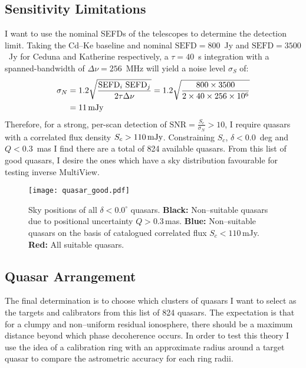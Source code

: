     \subsection{Sensitivity Limitations}   			
    	I want to use the nominal SEFDs of the telescopes to determine the detection limit. Taking the Cd--Ke baseline and nominal $\text{SEFD}=800$~Jy and $\text{SEFD}=3500$~Jy for Ceduna and Katherine respectively, a $\tau=40$~s integration with a spanned-bandwidth of $\Delta\nu=256$~MHz will yield a noise level $\sigma_S$ of: 	
    	\begin{align*}
    		\sigma_N & = 1.2\sqrt{\frac{\text{SEFD}_i~\text{SEFD}_j}{2\tau\Delta\nu}}=1.2\sqrt{\frac{800\times3500}{2\times40\times256\times10^{6}}} \\
    		& = 11\text{\,mJy}
    	\end{align*}    	
    	Therefore, for a strong, per-scan detection of $\text{SNR}=\frac{S_c}{\sigma_N}>10$, I require quasars with a correlated flux density $S_c>110\text{\,mJy}$. Constraining $S_c$, $\delta<0.0$~deg and $Q<0.3$~mas I find there are a total of 824 available quasars. From this list of good quasars, I desire the ones which have a sky distribution favourable for testing inverse MultiView.
    	\begin{figure}[h]
    		\texttt{[image: quasar\_good.pdf]} 
    		\caption[Good quasars]{Sky positions of all $\delta<0.0^{\circ}$ quasars. {\bf Black:} Non--suitable quasars due to positional uncertainty $Q>0.3$\,mas. {\bf Blue:} Non--suitable quasars on the basis of catalogued correlated flux $S_c<110$\,mJy. {\bf Red:} All suitable quasars.}
    		\label{quasarpos_good}
    	\end{figure}
       
    \subsection{Quasar Arrangement}
		The final determination is to choose which clusters of quasars I want to select as the targets and calibrators from this list of 824 quasars. The expectation is that for a clumpy and non--uniform residual ionosphere, there should be a maximum distance beyond which phase decoherence occurs. In order to test this theory I use the idea of a calibration ring with an approximate radius around a target quasar to compare the astrometric accuracy for each ring radii. 
		

